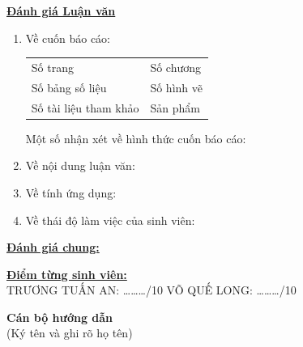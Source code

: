 \documentclass[12pt,a4paper]{article}
\begin{document}
\noindent \underline{\textbf{Đánh giá Luận văn}}
\begin{enumerate}[label=\arabic*., leftmargin=0.6cm]
    \item \small Về cuốn báo cáo: \\
    \vspace{-0.2cm}
    \begin{tabular}{p{} p{}}
        Số trang \dotfill & Số chương \dotfill \\
        Số bảng số liệu \dotfill & Số hình vẽ \dotfill \\
        Số tài liệu tham khảo \dotfill & Sản phẩm \dotfill
    \end{tabular}
    
    \vspace{0.2cm}
    Một số nhận xét về hình thức cuốn báo cáo: \dotfill \\
    \dotfill
    
    \vspace{0.2cm}
    \item Về nội dung luận văn: \dotfill \\
    \dotfill
    
    \vspace{0.2cm}
    \item Về tính ứng dụng: \dotfill \\
    \dotfill
    
    \vspace{0.2cm}
    \item Về thái độ làm việc của sinh viên: \dotfill \\
    \dotfill
\end{enumerate}

\vspace{0.2cm}

\noindent \underline{\textbf{Đánh giá chung:}} \dotfill \\
\dotfill

\vspace{0.3cm}

\noindent \underline{\textbf{Điểm từng sinh viên:}} \\[0.1cm]
\small TRƯƠNG TUẤN AN: \dots\dots\dots/10 \hfill VÕ QUẾ LONG: \dots\dots\dots/10 \hspace{2cm}

\vspace{0.3cm}

\hfill
\begin{minipage}[t]{0.45\textwidth}
    \centering
    \textbf{Cán bộ hướng dẫn} \\
    \vspace{0.1cm}
    (Ký tên và ghi rõ họ tên)
\end{minipage}
\end{document}
